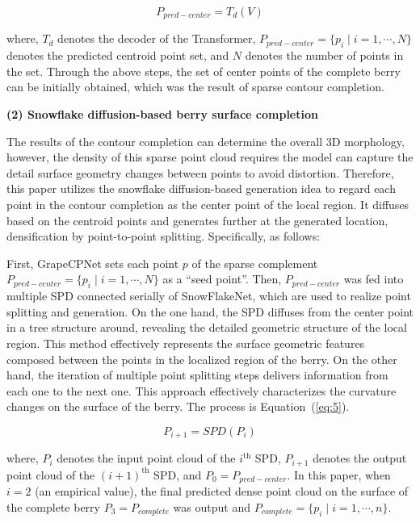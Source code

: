 \documentclass[12pt]{article}
\begin{document}
\begin{equation}
    P_{pred-center} = T_d(V)
    \label{eq:4}
\end{equation}

{\raggedright where, $T_d$ denotes the decoder of the Transformer, $P_{pred-center}=\{p_i \mid i=1,\cdots,N\}$ denotes the predicted centroid point set, and $N$ denotes the number of points in the set. 
Through the above steps, the set of center points of the complete berry can be initially obtained, which was the result of sparse contour completion.}

{\raggedright\textbf{(2) Snowflake diffusion-based berry surface completion}}

The results of the contour completion can determine the overall 3D morphology, however, the density of this sparse point cloud requires the model can capture the detail surface geometry changes between points to avoid distortion. 
Therefore, this paper utilizes the snowflake diffusion-based generation idea to regard each point in the contour completion as the center point of the local region. 
It diffuses based on the centroid points and generates further at the generated location, densification by point-to-point splitting. 
Specifically, as follows:

First, GrapeCPNet sets each point $p$ of the sparse complement $P_{pred-center}=\{p_i \mid i=1,\cdots,N\}$ as a ``seed point''. 
Then, $P_{pred-center}$ was fed into multiple SPD \citep{xiang_snowflakenet_2021} connected serially of SnowFlakeNet, which are used to realize point splitting and generation. 
On the one hand, the SPD diffuses from the center point in a tree structure around, revealing the detailed geometric structure of the local region. 
This method effectively represents the surface geometric features composed between the points in the localized region of the berry. 
On the other hand, the iteration of multiple point splitting steps delivers information from each one to the next one. 
This approach effectively characterizes the curvature changes on the surface of the berry. The process is Equation~(\ref{eq:5}).

\begin{equation}
    P_{i+1} = SPD(P_i)
    \label{eq:5}
\end{equation}

{\raggedright where, $P_i$ denotes the input point cloud of the $i^{\text{th}}$ SPD, $P_{i+1}$ denotes the output point cloud of the $(i+1)^{\text{th}}$ SPD, and $P_0=P_{pred-center}$. 
In this paper, when $i=2$ (an empirical value), the final predicted dense point cloud on the surface of the complete berry $P_3=P_{complete}$ was output and $P_{complete}=\{p_i \mid i=1,\cdots,n\}$.}
\end{document}
